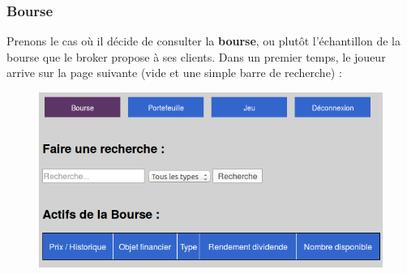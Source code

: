     \subsubsection{Bourse}
    Prenons le cas où il décide de consulter la \textbf{bourse}, ou plutôt l'échantillon de la bourse que le broker propose à ses clients. Dans un premier temps, le joueur arrive sur la page suivante (vide et une simple barre de recherche) : 
    \begin{figure}[H]
      \center
      \includegraphics[scale=0.4]{../graph/5-accueilbourse.png}  
    \end{figure}
      
